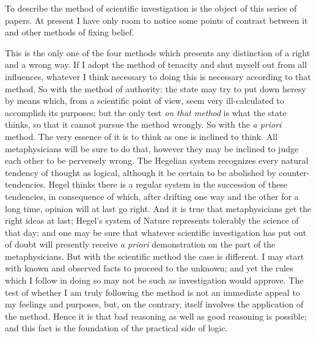 To describe the method of scientific investigation is the object of
this series of papers. At present I have only room to notice some
points of contrast between it and other methods of fixing belief.

This is the only one of the four methods which presents any
distinction of a right and a wrong way. If I adopt the method of
tenacity and shut myself out from all influences, whatever I think
necessary to doing this is necessary according to that method. So with
the method of authority: the state may try to put down heresy by means
which, from a scientific point of view, seem very ill-calculated to
accomplish its purposes; but the only test \textit{on that method} is
what the state thinks, so that it cannot pursue the method wrongly. So
with the \textit{a priori} method. The very essence of it is to think
as one is inclined to think. All metaphysicians will be sure to do
that, however they may be inclined to judge each other to be
perversely wrong. The Hegelian system recognizes every natural
tendency of thought as logical, although it be certain to be abolished
by counter-tendencies. Hegel thinks there is a regular system in the
succession of these tendencies, in consequence of which, after
drifting one way and the other for a long time, opinion will at last
go right.  And it is true that metaphysicians get the right
ideas at last; Hegel's system of Nature represents tolerably the
science of that day; and one may be sure that whatever scientific
investigation has put out of doubt will presently receive \textit{a
priori} demonstration on the part of the metaphysicians. But with the
scientific method the case is different. I may start with known and
observed facts to proceed to the unknown; and yet the rules which I
follow in doing so may not be such as investigation would approve. The
test of whether I am truly following the method is not an immediate
appeal to my feelings and purposes, but, on the contrary, itself
involves the application of the method. Hence it is that bad reasoning
as well as good reasoning is possible; and this fact is the foundation
of the practical side of logic.

